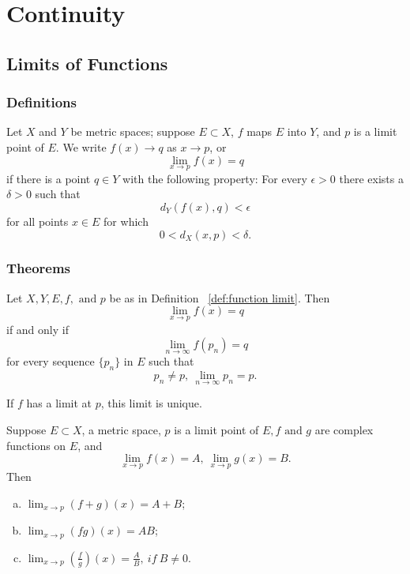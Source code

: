 \chapter{Continuity}

\section{Limits of Functions}
\subsection{Definitions}
\begin{deff}\label{def:function limit}
Let $X$ and $Y$ be metric spaces; suppose $E \subset X$, $f$ maps $E$ into $Y$, and $p$ is a limit point of $E$.  We write $f(x) \to q$ as $x \to p$, or $$\lim_{x \to p} f(x) = q$$ if there is a point $q \in Y$ with the following property: For every $\epsilon > 0$ there exists a $\delta > 0$ such that $$d_Y(f(x),q) < \epsilon$$ for all points $x \in E$ for which $$0 < d_X(x,p) < \delta.$$
\end{deff}

\subsection{Theorems}
\begin{thm}
	Let $X, Y, E, f, \mbox{ and } p$ be as in Definition ~\ref{def:function limit}. Then $$\lim_{x \to p} f(x) = q$$ if and only if $$\lim_{n \to \infty} f(p_n) = q$$ for every sequence $\{p_n\}$ in $E$ such that $$p_n \ne p, ~\lim_{n \to \infty}p_n = p.$$
\end{thm}

\begin{cor}
	If $f$ has a limit at $p$, this limit is unique.
\end{cor}

\begin{thm}
	Suppose $E \subset X$, a metric space, $p$ is a limit point of $E, f \mbox{ and } g$ are complex functions on $E$, and $$\lim_{x \to p}f(x) = A, ~ \lim_{x \to p} g(x) = B.$$ Then
	\begin{enumerate}[(a)]
		\item $\lim_{x \to p} (f+g)(x) = A + B$;
		\item $\lim_{x \to p} (fg)(x) = AB$;
		\item $\lim_{x \to p} (\frac{f}{g})(x) = \frac{A}{B}, ~ if ~ B \ne 0$.
	\end{enumerate}
\end{thm}

